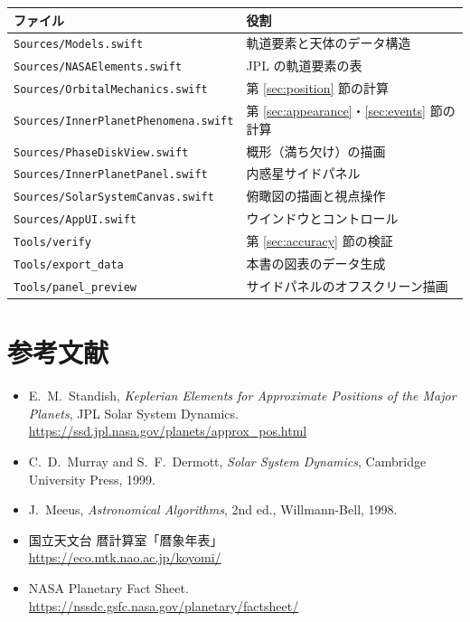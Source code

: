 \documentclass[a4paper,11pt]{ltjsarticle}
\begin{document}
\begin{center}
\begin{tabular}{ll}
  \toprule
  ファイル & 役割\\
  \midrule
  \texttt{Sources/Models.swift} & 軌道要素と天体のデータ構造\\
  \texttt{Sources/NASAElements.swift} & JPL の軌道要素の表\\
  \texttt{Sources/OrbitalMechanics.swift} & 第 \ref{sec:position} 節の計算\\
  \texttt{Sources/InnerPlanetPhenomena.swift} & 第 \ref{sec:appearance}・\ref{sec:events} 節の計算\\
  \texttt{Sources/PhaseDiskView.swift} & 概形（満ち欠け）の描画\\
  \texttt{Sources/InnerPlanetPanel.swift} & 内惑星サイドパネル\\
  \texttt{Sources/SolarSystemCanvas.swift} & 俯瞰図の描画と視点操作\\
  \texttt{Sources/AppUI.swift} & ウインドウとコントロール\\
  \midrule
  \texttt{Tools/verify} & 第 \ref{sec:accuracy} 節の検証\\
  \texttt{Tools/export\_data} & 本書の図表のデータ生成\\
  \texttt{Tools/panel\_preview} & サイドパネルのオフスクリーン描画\\
  \bottomrule
\end{tabular}
\end{center}

\section*{参考文献}

\begin{itemize}
  \item E.~M.~Standish, \emph{Keplerian Elements for Approximate Positions of the
        Major Planets}, JPL Solar System Dynamics.\\
        \url{https://ssd.jpl.nasa.gov/planets/approx_pos.html}
  \item C.~D.~Murray and S.~F.~Dermott, \emph{Solar System Dynamics},
        Cambridge University Press, 1999.
  \item J.~Meeus, \emph{Astronomical Algorithms}, 2nd ed., Willmann-Bell, 1998.
  \item 国立天文台 暦計算室「暦象年表」\\
        \url{https://eco.mtk.nao.ac.jp/koyomi/}
  \item NASA Planetary Fact Sheet.\\
        \url{https://nssdc.gsfc.nasa.gov/planetary/factsheet/}
\end{itemize}
\end{document}

